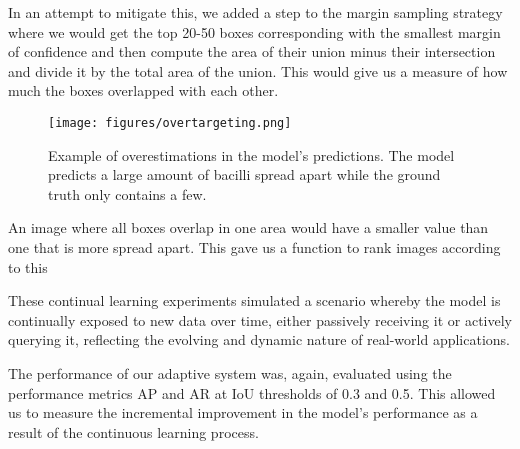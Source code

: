 \documentclass[../main.tex]{subfiles}
\begin{document}
    
    In an attempt to mitigate this, we added a step to the margin sampling strategy where we would get the top 20-50 boxes corresponding with the smallest margin of confidence and then compute the area of their union minus their intersection and divide it by the total area of the union. This would give us a measure of how much the boxes overlapped with each other. 
    
    \begin{figure}
        \centering
        \texttt{[image: figures/overtargeting.png]}
        \caption{Example of overestimations in the model's predictions.
        The model predicts a large amount of bacilli spread apart while the ground truth only contains a few.
        }
        \label{fig:overtargeting}
    \end{figure}
    
    
    An image where all boxes overlap in one area would have a smaller value than one that is more spread apart. This gave us a function to rank images according to this 

    These continual learning experiments simulated a scenario whereby the model is continually exposed to new data over time, either passively receiving it or actively querying it, reflecting the evolving and dynamic nature of real-world applications. 
    
    The performance of our adaptive system was, again, evaluated using the performance metrics AP and AR at IoU thresholds of 0.3 and 0.5. This allowed us to measure the incremental improvement in the model’s performance as a result of the continuous learning process.
    


    


\end{document}
